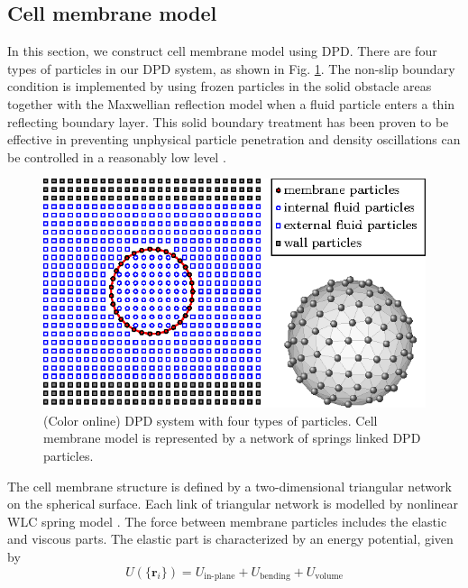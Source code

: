 \documentclass[%
 reprint,
 amsmath,amssymb,
 aps,
]{revtex4-1}
\begin{document}
\subsection{Cell membrane model}
In this section, we construct cell membrane model using DPD. There are four types of particles in our DPD system,  as shown in Fig. \ref{fig:4particles}. The non-slip boundary condition is implemented by using frozen particles in the solid obstacle areas together with the Maxwellian reflection model when a fluid particle enters a thin reflecting boundary layer. This solid boundary treatment has been proven to be effective in preventing unphysical particle penetration and density oscillations can be controlled in a reasonably low level \cite{Liu_particle_2016,liu_dissipative_2014,liu_dissipative_2007,zhou_movement_2013}.
\begin{figure}[!htb]
\centering
\includegraphics{4typeparticles.eps}
\caption{(Color online) DPD system with four types of particles. Cell membrane model is represented by a network of springs linked DPD particles.}\label{fig:4particles}
\end{figure}
The cell membrane structure is defined by a two-dimensional triangular network on the spherical surface. Each link of triangular network is modelled by nonlinear WLC spring model \cite{marko_stretching_1995}. The force between membrane particles includes the elastic and viscous parts. The elastic part is characterized by an energy potential, given by
\begin{equation}\label{eq:free_energy} 
U(\{\mathbf{r}_i\}) = U_{\textrm{in-plane}} + U_{\mathrm{bending}} + U_{\mathrm{volume}}
\end{equation}
\end{document}
